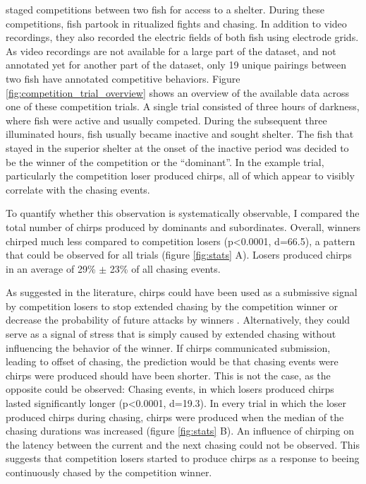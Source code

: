 \textcite{raabElectrocommunicationSignalsIndicate2021} staged competitions
between two fish for access to a shelter. During these competitions, fish
partook in ritualized fights and chasing. In addition to video recordings, they
also recorded the electric fields of both fish using electrode grids. As video
recordings are not available for a large part of the dataset, and not annotated
yet for another part of the dataset, only 19 unique pairings between two fish
have annotated competitive behaviors. Figure
\ref{fig:competition_trial_overview} shows an overview of the available data
across one of these competition trials. A single trial consisted of three hours
of darkness, where fish were active and usually competed. During the subsequent
three illuminated hours, fish usually became inactive and sought shelter. The
fish that stayed in the superior shelter at the onset of the inactive period
was decided to be the winner of the competition or the \enquote{dominant}. In
the example trial, particularly the competition loser produced chirps, all of
which appear to visibly correlate with the chasing events.

To quantify whether this observation is systematically observable, I compared
the total number of chirps produced by dominants and subordinates. Overall,
winners chirped much less compared to competition losers (p<0.0001, d=66.5), a pattern that could be observed for all trials (figure \ref{fig:stats} A).
Losers produced chirps in an average of 29\% $\pm$ 23\% of all chasing
events.

As suggested in the literature, chirps could have been used as a submissive
signal by competition losers to stop extended chasing by the competition winner
or decrease the probability of future attacks by winners
\parencite{henningerStatisticsNaturalCommunication2018}. Alternatively, they
could serve as a signal of stress that is simply caused by extended chasing
without influencing the behavior of the winner. If chirps communicated
submission, leading to offset of chasing, the prediction would be that chasing
events were chirps were produced should have been shorter. This is not the
case, as the opposite could be observed: Chasing events, in which losers
produced chirps lasted significantly longer (p<0.0001, d=19.3). In every trial
in which the loser produced chirps during chasing, chirps were produced when
the median of the chasing durations was increased (figure \ref{fig:stats} B). 
An influence of chirping on the latency between the current and the next
chasing could not be observed. This suggests that competition losers started to
produce chirps as a response to beeing continuously chased by the competition
winner.

